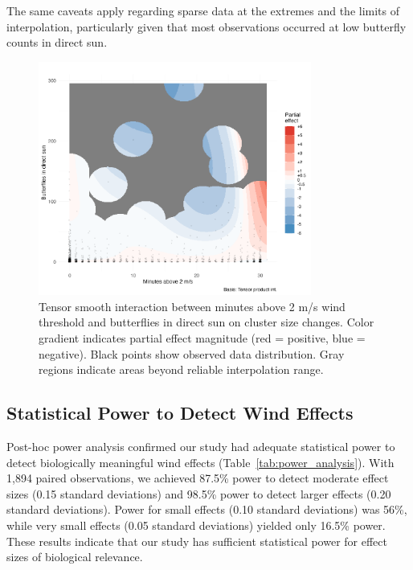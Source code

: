The same caveats apply regarding sparse data at the extremes and the limits of interpolation, particularly given that most observations occurred at low butterfly counts in direct sun.

\begin{figure}[htbp]
    \centering
    \includegraphics[width=0.8\textwidth]{supplemental/results/30_min_threshold/figures/interaction_wind_x_sun_binned.png}
    \caption{Tensor smooth interaction between minutes above 2 m/s wind threshold and butterflies in direct sun on cluster size changes. Color gradient indicates partial effect magnitude (red = positive, blue = negative). Black points show observed data distribution. Gray regions indicate areas beyond reliable interpolation range.}
    \label{fig:threshold_interaction}
\end{figure} 

\subsection{Statistical Power to Detect Wind Effects}

Post-hoc power analysis confirmed our study had adequate statistical power to detect biologically meaningful wind effects (Table~\ref{tab:power_analysis}). With 1,894 paired observations, we achieved 87.5\% power to detect moderate effect sizes (0.15 standard deviations) and 98.5\% power to detect larger effects (0.20 standard deviations). Power for small effects (0.10 standard deviations) was 56\%, while very small effects (0.05 standard deviations) yielded only 16.5\% power. These results indicate that our study has sufficient statistical power for effect sizes of biological relevance.

